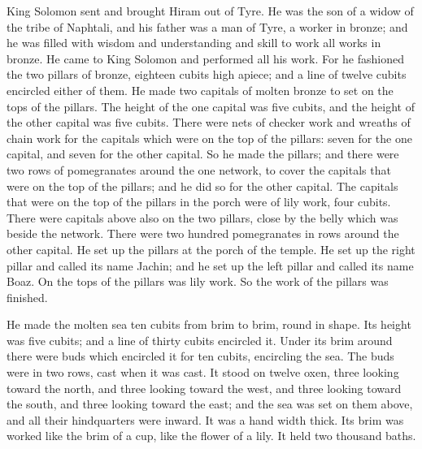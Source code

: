\begin{paracol}{2}
\begin{otherlanguage}{english}
 King Solomon sent and brought Hiram out of Tyre.
 He was the son of a widow of the tribe of Naphtali, and
his father was a man of Tyre, a worker in bronze; and he was filled with
wisdom and understanding and skill to work all works in bronze. He came
to King Solomon and performed all his work.  For he
fashioned the two pillars of bronze, eighteen cubits high apiece; and a
line of twelve cubits encircled either of them.  He made
two capitals of molten bronze to set on the tops of the pillars. The
height of the one capital was five cubits, and the height of the other
capital was five cubits.  There were nets of checker work
and wreaths of chain work for the capitals which were on the top of the
pillars: seven for the one capital, and seven for the other capital.
 So he made the pillars; and there were two rows of
pomegranates around the one network, to cover the capitals that were on
the top of the pillars; and he did so for the other capital.
 The capitals that were on the top of the pillars in the
porch were of lily work, four cubits.  There were
capitals above also on the two pillars, close by the belly which was
beside the network. There were two hundred pomegranates in rows around
the other capital.  He set up the pillars at the porch of
the temple. He set up the right pillar and called its name Jachin; and
he set up the left pillar and called its name Boaz.  On
the tops of the pillars was lily work. So the work of the pillars was
finished.

 He made the molten sea ten cubits from brim to brim,
round in shape. Its height was five cubits; and a line of thirty cubits
encircled it.  Under its brim around there were buds
which encircled it for ten cubits, encircling the sea. The buds were in
two rows, cast when it was cast.  It stood on twelve
oxen, three looking toward the north, and three looking toward the west,
and three looking toward the south, and three looking toward the east;
and the sea was set on them above, and all their hindquarters were
inward.  It was a hand width thick. Its brim was worked
like the brim of a cup, like the flower of a lily. It held two thousand
baths.


\end{otherlanguage}
\end{paracol}
